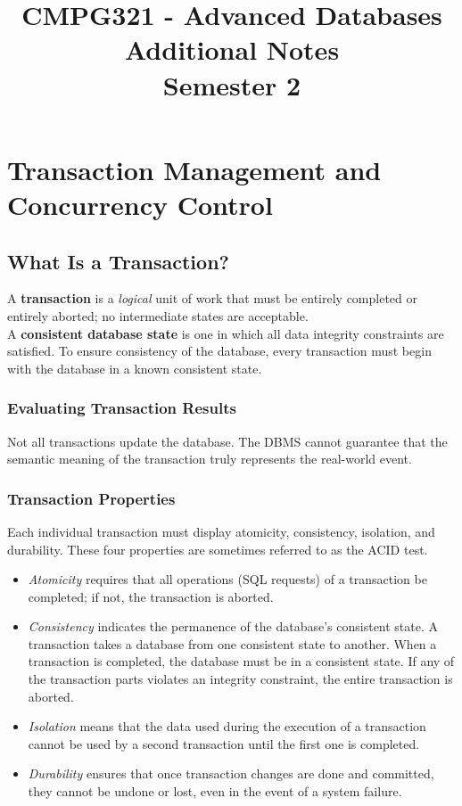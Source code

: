 \documentclass[a4paper, 11pt, titlepage]{report}
\begin{document}
\linespread{1.25}
\title{CMPG321 - Advanced Databases\\Additional Notes\\Semester 2}
\date{}
\maketitle
\tableofcontents{}

\chapter{Transaction Management and Concurrency Control}
\section{What Is a Transaction?}
A \textbf{transaction} is a \textit{logical} unit of work that must be entirely completed or entirely aborted; no intermediate states are acceptable.\\
A \textbf{consistent database state} is one in which all data integrity constraints are satisfied. To ensure consistency of the database, every transaction must begin with the database in a known consistent state.
\subsection{Evaluating Transaction Results}
Not all transactions update the database. The DBMS cannot guarantee that the semantic meaning of the transaction truly represents the real-world event.
\subsection{Transaction Properties}
Each individual transaction must display atomicity, consistency, isolation, and durability.
These four properties are sometimes referred to as the ACID test.
\begin{itemize}
\item \textit{Atomicity} requires that all operations (SQL requests) of a transaction be completed;
if not, the transaction is aborted.
\item \textit{Consistency} indicates the permanence of the database's consistent state. A transaction takes a database from one consistent state to another. When a transaction is completed, the database must be in a consistent state. If any of the transaction parts violates an integrity constraint, the entire transaction is aborted.
\item \textit{Isolation} means that the data used during the execution of a transaction cannot be used by a second transaction until the first one is completed.
\item \textit{Durability} ensures that once transaction changes are done and committed, they cannot be undone or lost, even in the event of a system failure.
\end{itemize}
\end{document}
